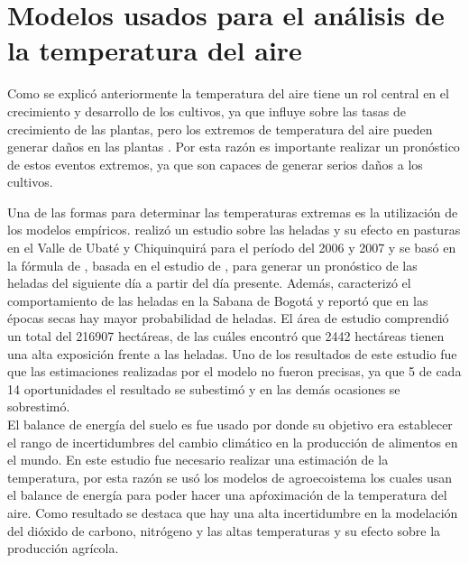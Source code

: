 \documentclass[11pt]{article}
\begin{document}

\section{Modelos usados para el análisis de la temperatura del aire}

Como se explicó anteriormente la temperatura del aire tiene un rol central en el crecimiento y desarrollo de los cultivos, ya que influye sobre las tasas de crecimiento de las plantas, pero los extremos de temperatura del aire pueden generar daños en las plantas \citep{wheeler2000}. Por esta razón es importante realizar un pronóstico de estos eventos extremos, ya que son capaces de generar serios daños a los cultivos.

Una de las formas para determinar las temperaturas extremas es la utilización de los modelos empíricos. \citet{Gomez2014} realizó un estudio sobre las heladas y su efecto en pasturas en el Valle de Ubaté y Chiquinquirá para el período del 2006 y 2007 y se basó en la fórmula de \citet{Allen1957a}, basada en el estudio de \citet{Snyder2010}, para generar un pronóstico de las heladas del siguiente día a partir del día presente. Además, caracterizó el comportamiento de las heladas en la Sabana de Bogotá y reportó que en las épocas secas hay mayor probabilidad de heladas. El área de estudio comprendió un total del 216907 hectáreas, de las cuáles \citet{Gomez2014} encontró que 2442 hectáreas tienen una alta exposición frente a las heladas. Uno de los resultados de este estudio fue que las estimaciones realizadas por el modelo no fueron precisas, ya que 5 de cada 14 oportunidades el resultado se subestimó y en las demás ocasiones se sobrestimó.\\

El balance de energía del suelo es fue usado por \citet{Rosenzweig2014a} donde su objetivo era establecer el rango de incertidumbres del cambio climático en la producción de alimentos en el mundo. En este estudio fue necesario realizar una estimación de la temperatura, por esta razón se usó los modelos de agroecoistema los cuales usan el balance de energía para poder hacer una apŕoximación de la temperatura del aire. Como resultado se destaca que hay una alta incertidumbre en la modelación del dióxido de carbono, nitrógeno y las altas temperaturas y su efecto sobre la producción agrícola.\\
\end{document}
